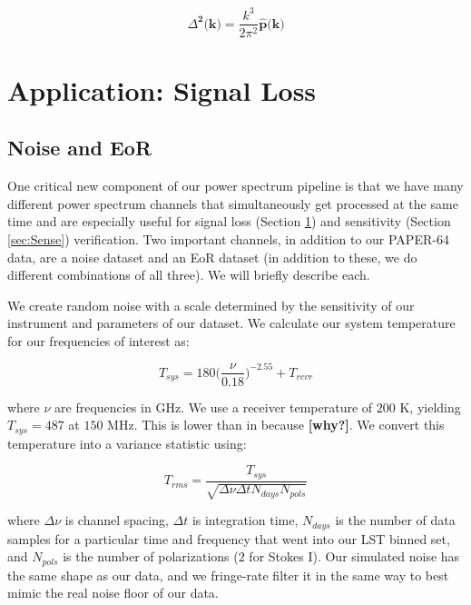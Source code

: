 \documentclass[preprint2,numberedappendix,tighten,twocolappendix]{aastex6}  %
\newcommand{\cc}[1]{{\color{purple} \textbf{[#1]}}}
\begin{document}
\begin{equation}
\Delta^{\textbf{2}}\textbf{(k)} = \frac{k^{3}}{2\pi^{2}}\hat{\textbf{p}}\textbf{(k)}
\end{equation}

\section{Application: Signal Loss}
\label{sec:Sigloss}

\subsection{Noise and EoR}

One critical new component of our power spectrum pipeline is that we have many different power spectrum channels that simultaneously get processed at the same time and are especially useful for signal loss (Section \ref{sec:Sigloss}) and sensitivity (Section \ref{sec:Sense}) verification. Two important channels, in addition to our PAPER-64 data, are a noise dataset and an EoR dataset (in addition to these, we do different combinations of all three). We will briefly describe each.

We create random noise with a scale determined by the sensitivity of our instrument and parameters of our dataset. We calculate our system temperature for our frequencies of interest as:

\begin{equation}
T_{sys} = 180\Big(\frac{\nu}{0.18}\Big)^{-2.55} + T_{rcvr}
\end{equation}

where $\nu$ are frequencies in GHz. We use a receiver temperature of $200$ K, yielding $T_{sys} = 487$ at $150$ MHz. This is lower than in \citet{ali_et_al2015} because \cc{why?}. We convert this temperature into a variance statistic using:

\begin{equation}
T_{rms} = \frac{T_{sys}}{\sqrt{\Delta\nu \Delta t N_{days} N_{pols}}}
\end{equation}

where $\Delta\nu$ is channel spacing, $\Delta t$ is integration time, $N_{days}$ is the number of data samples for a particular time and frequency that went into our LST binned set, and $N_{pols}$ is the number of polarizations ($2$ for Stokes I). Our simulated noise has the same shape as our data, and we fringe-rate filter it in the same way to best mimic the real noise floor of our data. 
\end{document}
